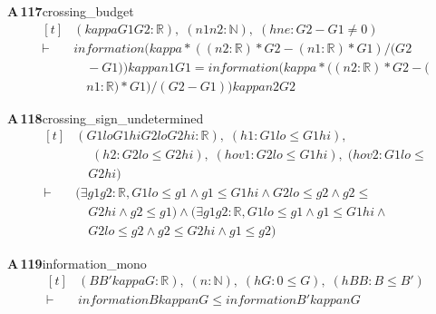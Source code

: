 \documentclass[conference]{IEEEtran}
\theoremstyle{definition}
\newcommand{\lean}[1]{\textsf{\footnotesize #1}}
\begin{document}
\noindent\textbf{A\,117}\quad\lean{crossing\_budget}
{\footnotesize\[ \begin{aligned}[t]
&(\mathit{kappa} \mathit{G1} \mathit{G2} : \mathbb{R} ),\; (\mathit{n1} \mathit{n2} : \mathbb{N} ),\; (\mathit{hne} : \mathit{G2} - \mathit{G1} \neq 0)\\
\vdash\;&\mathit{information} (\mathit{kappa} * ((\mathit{n2} : \mathbb{R} ) * \mathit{G2} - (\mathit{n1} : \mathbb{R} ) * \mathit{G1}) / (\mathit{G2}\\
&\quad - \mathit{G1})) \mathit{kappa} \mathit{n1} \mathit{G1} = \mathit{information} (\mathit{kappa} * ((\mathit{n2} : \mathbb{R} ) * \mathit{G2} - (\\
&\quad \mathit{n1} : \mathbb{R} ) * \mathit{G1}) / (\mathit{G2} - \mathit{G1})) \mathit{kappa} \mathit{n2} \mathit{G2}
\end{aligned} \]}

\noindent\textbf{A\,118}\quad\lean{crossing\_sign\_undetermined}
{\footnotesize\[ \begin{aligned}[t]
&(\mathit{G1lo} \mathit{G1hi} \mathit{G2lo} \mathit{G2hi} : \mathbb{R} ),\; (\mathit{h1} : \mathit{G1lo} \leq \mathit{G1hi}),\\
&\quad \; (\mathit{h2} : \mathit{G2lo} \leq \mathit{G2hi}),\; (\mathit{hov1} : \mathit{G2lo} \leq \mathit{G1hi}),\; (\mathit{hov2} : \mathit{G1lo} \leq\\
&\quad \mathit{G2hi})\\
\vdash\;&(\exists \mathit{g1} \mathit{g2} : \mathbb{R} , \mathit{G1lo} \leq \mathit{g1} \wedge \mathit{g1} \leq \mathit{G1hi} \wedge \mathit{G2lo} \leq \mathit{g2} \wedge \mathit{g2} \leq\\
&\quad \mathit{G2hi} \wedge \mathit{g2} \leq \mathit{g1}) \wedge (\exists \mathit{g1} \mathit{g2} : \mathbb{R} , \mathit{G1lo} \leq \mathit{g1} \wedge \mathit{g1} \leq \mathit{G1hi} \wedge\\
&\quad \mathit{G2lo} \leq \mathit{g2} \wedge \mathit{g2} \leq \mathit{G2hi} \wedge \mathit{g1} \leq \mathit{g2})
\end{aligned} \]}

\noindent\textbf{A\,119}\quad\lean{information\_mono}
{\footnotesize\[ \begin{aligned}[t]
&(\mathit{B} \mathit{B'} \mathit{kappa} \mathit{G} : \mathbb{R} ),\; (\mathit{n} : \mathbb{N} ),\; (\mathit{hG} : 0 \leq \mathit{G}),\; (\mathit{hBB} : \mathit{B} \leq \mathit{B'})\\
\vdash\;&\mathit{information} \mathit{B} \mathit{kappa} \mathit{n} \mathit{G} \leq \mathit{information} \mathit{B'} \mathit{kappa} \mathit{n} \mathit{G}
\end{aligned} \]}
\end{document}
